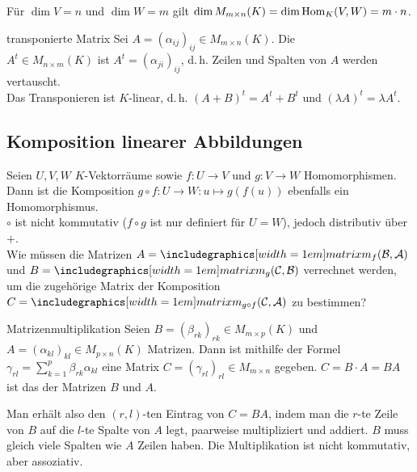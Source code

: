 \begin{Kor}
    Für $\dim V = n$ und $\dim W = m$ gilt
    $\dim M_{m \times n}(K) = \dim \operatorname{Hom}_K(V, W) = m \cdot n$.
\end{Kor}

\begin{Def}{transponierte Matrix}
    Sei $A = (\alpha_{ij})_{ij} \in M_{m \times n}(K)$.
    Die  \\
    $A^t \in M_{n \times m}(K)$ ist
    $A^t = (\alpha_{ji})_{ij}$, d.\,h. Zeilen und Spalten von $A$ werden
    vertauscht. \\
    Das Transponieren ist $K$-linear, d.\,h. $(A + B)^t = A^t + B^t$ und
    $(\lambda A)^t = \lambda A^t$.
\end{Def}

\subsection{%
    Komposition linearer Abbildungen%
}

\begin{Bem}
    Seien $U, V, W$ $K$-Vektorräume sowie $f: U \rightarrow V$ und
    $g: V \rightarrow W$ Homomorphismen.
    Dann ist die Komposition $g \circ f: U \rightarrow W: u \mapsto g(f(u))$
    ebenfalls ein Homomorphismus. \\
    $\circ$ ist nicht kommutativ ($f \circ g$ ist nur definiert für $U = W$),
    jedoch distributiv über $+$. \\
    Wie müssen die Matrizen $A = \hommatrix{f}{B}{A}$ und
    $B = \hommatrix{g}{C}{B}$ verrechnet werden, um die zugehörige Matrix
    der Komposition $C = \hommatrix{g \circ f}{C}{A}$ zu bestimmen?
\end{Bem}

\begin{Def}{Matrizenmultiplikation}
    Seien $B = (\beta_{rk})_{rk} \in M_{m \times p}(K)$ und 
    $A = (\alpha_{kl})_{kl} \in M_{p \times n}(K)$ Matrizen.
    Dann ist mithilfe der Formel
    $\gamma_{rl} = \sum_{k=1}^p \beta_{rk} \alpha_{kl}$ eine Matrix
    $C = (\gamma_{rl})_{rl} \in M_{m \times n}$ gegeben.
    $C = B \cdot A = BA$ ist das  der Matrizen $B$ und $A$.
\end{Def}

\begin{Bem}
    Man erhält also den $(r, l)$-ten Eintrag von $C = BA$, indem
    man die $r$-te Zeile von $B$ auf die $l$-te Spalte von $A$ legt,
    paarweise multipliziert und addiert.
    $B$ muss gleich viele Spalten wie $A$ Zeilen haben.
    Die Multiplikation ist nicht kommutativ, aber assoziativ.
\end{Bem}

